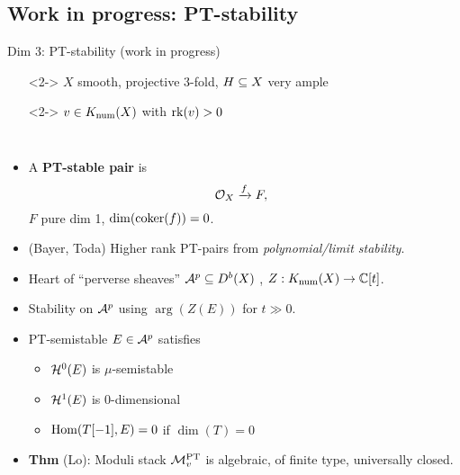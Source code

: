 \documentclass[8pt]{beamer} %
\begin{document}
\subsection{Work in progress: PT-stability}
\begin{frame}{Dim 3: PT-stability (work in progress)}
    \begin{itemize}
        \item[]<2-> $X$ smooth, projective 3-fold, $H \subseteq X$ very ample
        \item[]<2-> $v \in K_{\mathrm{num}}(X)$ with $\operatorname{\mathrm{rk}}(v) > 0$
    \end{itemize}
    
    \begin{columns}[t]
        \begin{itemize}
            \item<3-> A \textbf{PT-stable pair} is
            \[ \mathcal{O}_X \xrightarrow{f} F, \]
            $F$ pure dim 1, $\dim(\operatorname{\mathrm{coker}}(f)) = 0$.
            \item<4-> (Bayer, Toda) Higher rank PT-pairs from \textit{polynomial/limit stability}.
            \item<5-> Heart of ``perverse sheaves'' $\mathcal{A}^p \subseteq D^b(X)$ , $Z: K_{\mathrm{num}}(X) \to \mathbb{C}[t]$.
            \item<5-> Stability on $\mathcal{A}^p$ using $\arg(Z(E))$ for $t \gg 0$.
            \item<6-> PT-semistable $E \in \mathcal{A}^p$ satisfies
            \begin{itemize}
                \item<7-> $\mathcal{H}^0(E)$ is $\mu$-semistable
                \item<7-> $\mathcal{H}^1(E)$ is 0-dimensional
                \item<8-> $\mathrm{Hom}(T[-1], E) = 0$ if $\dim(T) = 0$
            \end{itemize}
            \item<9-> \textbf{Thm} (Lo): Moduli stack $\mathcal{M}^{\text{PT}}_v$ is algebraic, of finite type, universally closed.
        \end{itemize}
        

\end{columns}
\end{frame}
\end{document}
